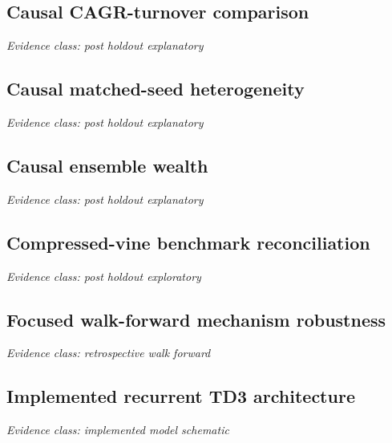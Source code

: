\documentclass[11pt,a4paper]{article}
\begin{document}
\subsection*{Causal CAGR-turnover comparison}
\noindent\textit{Evidence class: post holdout explanatory}\par\medskip
\begin{center}

\end{center}
\clearpage
\subsection*{Causal matched-seed heterogeneity}
\noindent\textit{Evidence class: post holdout explanatory}\par\medskip
\begin{center}

\end{center}
\clearpage
\subsection*{Causal ensemble wealth}
\noindent\textit{Evidence class: post holdout explanatory}\par\medskip
\begin{center}

\end{center}
\clearpage
\subsection*{Compressed-vine benchmark reconciliation}
\noindent\textit{Evidence class: post holdout exploratory}\par\medskip
\begin{center}

\end{center}
\clearpage
\subsection*{Focused walk-forward mechanism robustness}
\noindent\textit{Evidence class: retrospective walk forward}\par\medskip
\begin{center}

\end{center}
\clearpage
\subsection*{Implemented recurrent TD3 architecture}
\noindent\textit{Evidence class: implemented model schematic}\par\medskip
\begin{center}

\end{center}
\clearpage
\end{document}
